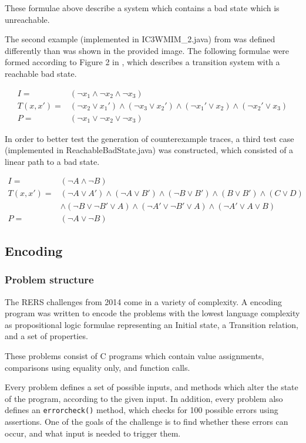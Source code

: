 \documentclass[a4paper]{article}
\begin{document}
These formulae above describe a system which contains a bad state which is unreachable.

The second example (implemented in IC3WMIM\_2.java) from \cite{Somenzi2011} was defined differently than was shown in the provided image.
The following formulae were formed according to Figure 2 in \cite{Somenzi2011}, which describes a transition system with a reachable bad state.

\begin{align*}
I =& (\lnot x_1 \land \lnot x_2 \land \lnot x_3)\\
T(x,x') =& (\lnot x_2 \lor x_1') \land (\lnot x_3 \lor x_2') \land (\lnot x_1' \lor x_2) \land (\lnot x_2' \lor x_3)\\
P =& (\lnot x_1 \lor \lnot x_2 \lor \lnot x_3)
\end{align*}

In order to better test the generation of counterexample traces, a third test case (implemented in ReachableBadState.java) was constructed, which consisted of a linear path to a bad state.

\begin{align*}
I =& (\lnot A \land \lnot B)\\
T(x,x') =& (\lnot A \lor A') \land (\lnot A \lor B') \land (\lnot B \lor B') \land (B \lor B') \land (C \lor D)\\
&\land (\lnot B \lor \lnot B' \lor A) \land (\lnot A' \lor \lnot B' \lor A) \land (\lnot A' \lor A \lor B)\\
P =& (\lnot A \lor \lnot B)
\end{align*}

\subsection{Encoding} %
\subsubsection{Problem structure}
The RERS challenges from 2014 come in a variety of complexity. A encoding program was written to encode the problems with the lowest language complexity as propositional logic formulae representing an Initial state, a Transition relation, and a set of properties.

These problems consist of C programs which contain value assignments, comparisons using equality only, and function calls.

Every problem defines a set of possible inputs, and methods which alter the state of the program, according to the given input.
In addition, every problem also defines an \texttt{errorcheck()} method, which checks for 100 possible errors using assertions. One of the goals of the challenge is to find whether these errors can occur, and what input is needed to trigger them.
\end{document}
